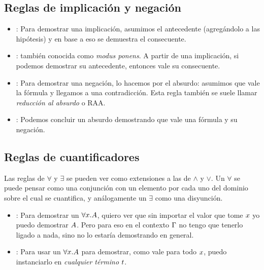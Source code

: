 \subsection{Reglas de implicación y negación}

\begin{multicols}{2}
    \proofTreeImpI
    \proofTreeImpE
\end{multicols}

\proofSpacing

\begin{multicols}{2}
    \proofTreeNotI
    \proofTreeNotE
\end{multicols}

\begin{itemize}
    \item {}: Para demostrar una implicación, asumimos el antecedente
    (agregándolo a las hipótesis) y en base a eso se demuestra el consecuente.
    \item {}: también conocida como \textit{modus ponens}. A partir de
    una implicación, si podemos demostrar su antecedente, entonces vale su consecuente.
    \item {}: Para demostrar una negación, lo hacemos por el absurdo:
    asumimos que vale la fórmula y llegamos a una contradicción. Esta regla
    también se suele llamar \textit{reducción al absurdo} o RAA.
    \item {}: Podemos concluir un absurdo demostrando que vale una
    fórmula y su negación.
\end{itemize}

\subsection{Reglas de cuantificadores}

Las reglas de $\forall$ y $\exists$ se pueden ver como extensiones a las de
$\wedge$ y $\vee$. Un $\forall$ se puede pensar como una conjunción con un
elemento por cada uno del dominio sobre el cual se cuantifica, y análogamente un $\exists$ como una disyunción.

\begin{multicols}{2}
    \proofTreeForallI
    \proofTreeForallE
\end{multicols}

\begin{itemize}
    \item {}: Para demostrar un $\forall x. A$, quiero ver que sin importar el valor que tome $x$ yo puedo demostrar $A$. Pero para eso en el contexto $\Gamma$ no tengo que tenerlo ligado a nada, sino no lo estaría demostrando en general.
    \item {}: Para usar un $\forall x.A$ para demostrar, como
    vale para todo $x$, puedo instanciarlo en \textit{cualquier término} $t$.
\end{itemize}


